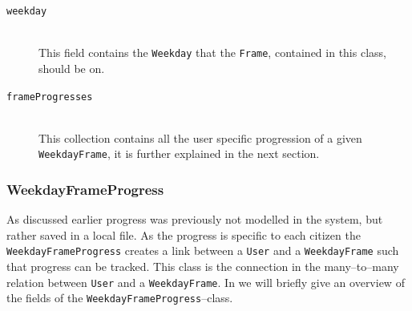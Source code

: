 \begin{table}[ht]
    \caption{Table that represents the \texttt{WeekdayFrame} class}
    \label{tbl:WeekdayFrame}
\end{table}

\begin{description}
    \item [\texttt{weekday}] \hfill \\
    This field contains the \texttt{Weekday} that the \texttt{Frame}, contained in this class, should be on.
    \item [\texttt{frameProgresses}] \hfill \\
    This collection contains all the user specific progression of a given \texttt{WeekdayFrame}, it is further explained in the next section.
\end{description}

\subsubsection{WeekdayFrameProgress}\label{subsubsec:weekdayframeprogress}
As discussed earlier progress was previously not modelled in the system, but rather saved in a local file.
As the progress is specific to each citizen the \texttt{WeekdayFrameProgress} creates a link between a \texttt{User} and a \texttt{WeekdayFrame} such that progress can be tracked.
This class is the connection in the many--to--many relation between \texttt{User} and a \texttt{WeekdayFrame}.
In  we will briefly give an overview of the fields of the \texttt{WeekdayFrameProgress}--class.

